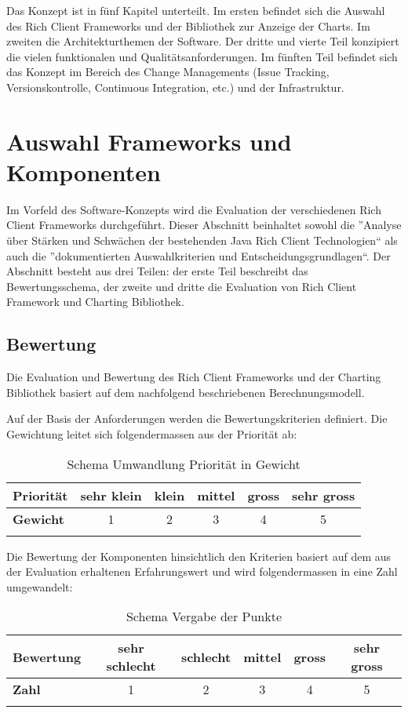 Das Konzept ist in fünf Kapitel unterteilt. Im ersten befindet sich die Auswahl des Rich Client Frameworks und der Bibliothek zur Anzeige der Charts. Im zweiten die Architekturthemen der Software. Der dritte und vierte Teil konzipiert die vielen funktionalen und Qualitätsanforderungen. Im fünften Teil befindet sich das Konzept im Bereich des Change Managements (Issue Tracking, Versionskontrolle, Continuous Integration, etc.) und der Infrastruktur.


\chapter{Auswahl Frameworks und Komponenten}\label{selection_rcp_fw}
Im Vorfeld des Software-Konzepts wird die Evaluation der verschiedenen Rich Client Frameworks durchgeführt. Dieser Abschnitt beinhaltet sowohl die ''Analyse über Stärken und Schwächen der bestehenden Java Rich Client Technologien`` als auch die ''dokumentierten Auswahlkriterien und Entscheidungsgrundlagen``. Der Abschnitt besteht aus drei Teilen: der erste Teil beschreibt das Bewertungsschema, der zweite und dritte die Evaluation von Rich Client Framework und Charting Bibliothek.


\section{Bewertung}
Die Evaluation und Bewertung des Rich Client Frameworks und der Charting Bibliothek basiert auf dem nachfolgend beschriebenen Berechnungsmodell. 

Auf der Basis der Anforderungen werden die Bewertungskriterien definiert. Die Gewichtung leitet sich folgendermassen aus der Priorität ab:
\begin{longtable}{|l|c|c|c|c|c|}\hline
 \textbf{Priorität} & sehr klein & klein & mittel & gross & sehr gross\\\hline
 \textbf{Gewicht} & 1 & 2 & 3 & 4 & 5\\\hline
 \caption{Schema Umwandlung Priorität in Gewicht}
\end{longtable}

Die Bewertung der Komponenten hinsichtlich den Kriterien basiert auf dem aus der Evaluation erhaltenen Erfahrungswert und wird folgendermassen in eine Zahl umgewandelt:
\begin{longtable}{|l|c|c|c|c|c|}\hline
 \textbf{Bewertung} & sehr schlecht & schlecht & mittel & gross & sehr gross\\\hline
 \textbf{Zahl} & 1 & 2 & 3 & 4 & 5\\\hline
 \caption{Schema Vergabe der Punkte}
\end{longtable}

